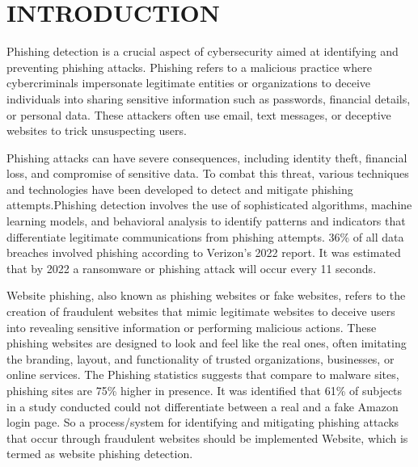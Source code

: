 \chapter{INTRODUCTION}
\thispagestyle{empty}
\onehalfspacing
\pagestyle{fancy}
\fancyhf{}
\fancyhead[LE,RO]{\textit{\footnotesize \thepage}}
 
\renewcommand{\headrulewidth}{2pt}
\renewcommand{\footrulewidth}{1pt}
\par 
Phishing detection is a crucial aspect of cybersecurity aimed at identifying and preventing phishing attacks. Phishing refers to a malicious practice where cybercriminals impersonate legitimate entities or organizations to deceive individuals into sharing sensitive information such as passwords, financial details, or personal data. These attackers often use email, text messages, or deceptive websites to trick unsuspecting users.
\par Phishing attacks can have severe consequences, including identity theft, financial loss, and compromise of sensitive data. To combat this threat, various techniques and technologies have been developed to detect and mitigate phishing attempts.Phishing detection involves the use of sophisticated algorithms, machine learning models, and behavioral analysis to identify patterns and indicators that differentiate legitimate communications from phishing attempts. 36\% of all data breaches involved phishing according to Verizon’s 2022 report. It was estimated that by 2022 a ransomware or phishing attack will occur every 11 seconds.

\par Website phishing, also known as phishing websites or fake websites, refers to the creation of fraudulent websites that mimic legitimate websites to deceive users into revealing sensitive information or performing malicious actions. These phishing websites are designed to look and feel like the real ones, often imitating the branding, layout, and functionality of trusted organizations, businesses, or online services. The Phishing statistics suggests that compare to malware sites, phishing sites are 75\% higher in presence. It was identified that 61\% of subjects in a study conducted could not differentiate between a real and a fake Amazon login page. So a process/system for identifying and mitigating phishing attacks that occur through fraudulent websites should be implemented Website, which is termed as website phishing detection.

